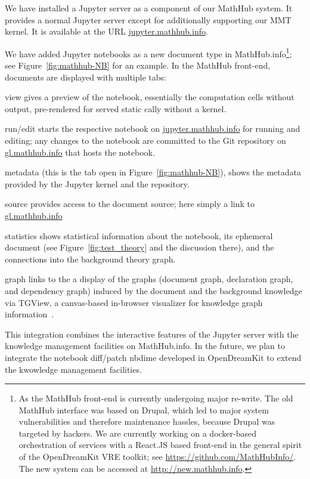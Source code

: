 We have installed a Jupyter server as a component of our MathHub system.
It provides a normal Jupyter server except for additionally supporting our MMT kernel.
It is available at the URL \url{jupyter.mathhub.info}.

We have added Jupyter notebooks as a new document type in MathHub.info\footnote{As the MathHub front-end is currently undergoing major re-write.
  The old MathHub interface was based on Drupal, which led to major system vulnerabilities and therefore maintenance hassles, because Drupal was targeted by hackers.
  We are currently working on a docker-based orchestration of services with a React.JS based front-end in the general spirit of the OpenDreamKit VRE toolkit; see \url{https://github.com/MathHubInfo/}. The new system can be accessed at \url{http://new.mathhub.info}.}; see Figure~\ref{fig:mathhub-NB} for an example. In the MathHub front-end, documents are displayed with multiple tabs:
\begin{compactenum}
\item \textsf{view} gives a preview of the notebook, essentially the computation cells without output, pre-rendered for served static cally without a kernel.
\item \textsf{run/edit} starts the respective notebook  on \url{jupyter.mathhub.info} for running and editing; any changes to the notebook are committed to the Git repository on  \url{gl.mathhub.info} that hosts the notebook. 
\item \textsf{metadata} (this is the tab open in Figure~\ref{fig:mathhub-NB}), shows the metadata provided by the Jupyter kernel and the repository. 
\item \textsf{source} provides access to the document source; here simply a link to \url{gl.mathhub.info}
\item \textsf{statistics} shows statistical information about the notebook, its ephemeral document (see Figure~\ref{fig:test_theory} and the discussion there), and the connections into the background theory graph. 
\item \textsf{graph} links to the a display of the graphs (document graph, declaration graph, and dependency graph) induced by the document and the background knowledge via TGView, a canvas-based in-browser visualizer for knowledge graph information~\cite{RupKohMue:fitgv17}.
\end{compactenum}
This integration combines the interactive features of the Jupyter server with the knowledge management facilities on MathHub.info. In the future, we plan to integrate the notebook diff/patch \textsf{nbdime} developed in OpenDreamKit to extend the kwowledge management facilities. 

